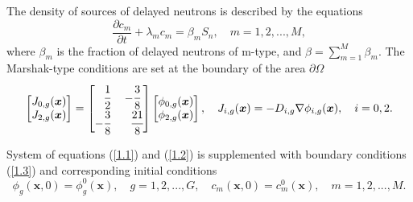 \documentclass[a4paper]{jpconf}
\begin{document}
The density of sources of delayed neutrons is described by the equations
\begin{equation}\label{1.2}
 \frac{\partial c_m}{\partial t} + \lambda_m c_m = \beta_m S_{n},
 \quad m = 1,2, ..., M, 
\end{equation}
where $\beta_m$ is the fraction of delayed neutrons of m-type, and
$
 \beta = \sum_{m=1}^{M} \beta_m.
$
The Marshak-type conditions are set at the boundary of the area $\partial \Omega$
\begin{equation}\label{1.3}
\begin{split}
\begin{bmatrix}
J_{0,g}(\bm x)\\
J_{2,g}(\bm x)\\
\end{bmatrix}
=
\begin{bmatrix}
\phantom{-}\cfrac{1}{2} & -\cfrac{3}{8} \\
 -\cfrac{3}{8} & \phantom{-}\cfrac{21}{8} \\
\end{bmatrix}
\begin{bmatrix}
\phi_{0,g}(\bm x) \\
\phi_{2,g}(\bm x) \\
\end{bmatrix},
\quad
J_{i,g}(\bm x) = -D_{i,g}\nabla\phi_{i,g}(\bm x), 
\quad
i = 0, 2.
\end{split}
\end{equation}

System of equations (\ref{1.1}) and (\ref{1.2}) is supplemented with boundary conditions (\ref{1.3}) and corresponding initial conditions
\begin{equation}\label{1.4}
 \phi_g(\bm x,0) = \phi_g^0(\bm x), 
 \quad g = 1,2, ..., G,
 \quad c_m(\bm x,0) = c_m^0(\bm x), 
 \quad m = 1,2, ..., M.
\end{equation}
\end{document}
